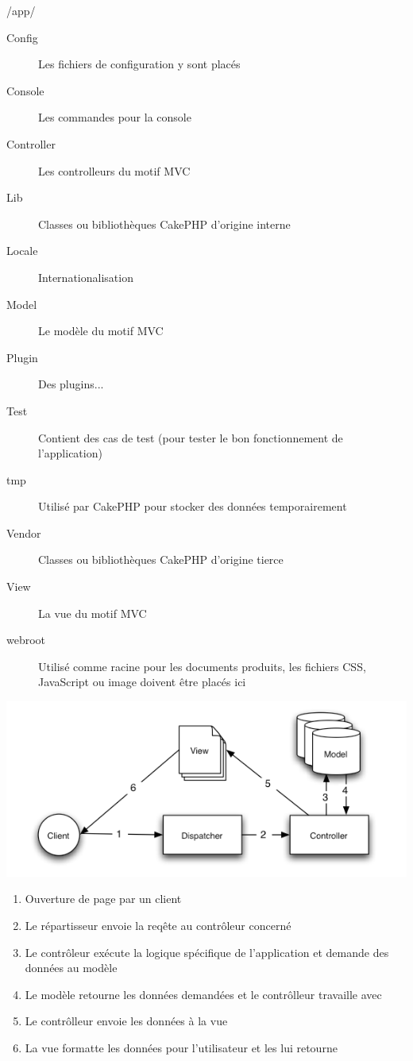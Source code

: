 \begin{frame}{/app/}
\begin{description}
  \item [Config] Les fichiers de configuration y sont placés
  \item [Console] Les commandes pour la console
  \item [Controller] Les controlleurs du motif MVC
  \item [Lib] Classes ou bibliothèques CakePHP d'origine interne
  \item [Locale] Internationalisation
  \item [Model] Le modèle du motif MVC
  \item [Plugin] Des plugins...
  \item [Test] Contient des cas de test (pour tester le bon fonctionnement de l'application)
  \item [tmp] Utilisé par CakePHP pour stocker des données temporairement
  \item [Vendor] Classes ou bibliothèques CakePHP d'origine tierce
  \item [View] La vue du motif MVC
  \item [webroot] Utilisé comme racine pour les documents produits, les fichiers CSS, JavaScript ou image doivent être placés ici
\end{description}
\end{frame}

\begin{frame}
\begin{center}
\includegraphics[scale=0.50]{img/basic_mvc.png}

\begin{enumerate}
  \item Ouverture de page par un client
  \item Le répartisseur envoie la reqête au contrôleur concerné
  \item Le contrôleur exécute la logique spécifique de l’application et demande des données au modèle
  \item Le modèle retourne les données demandées et le contrôlleur travaille avec
  \item Le contrôlleur envoie les données à la vue
  \item La vue formatte les données pour l'utilisateur et les lui retourne
\end{enumerate}
\end{center}
\end{frame}




